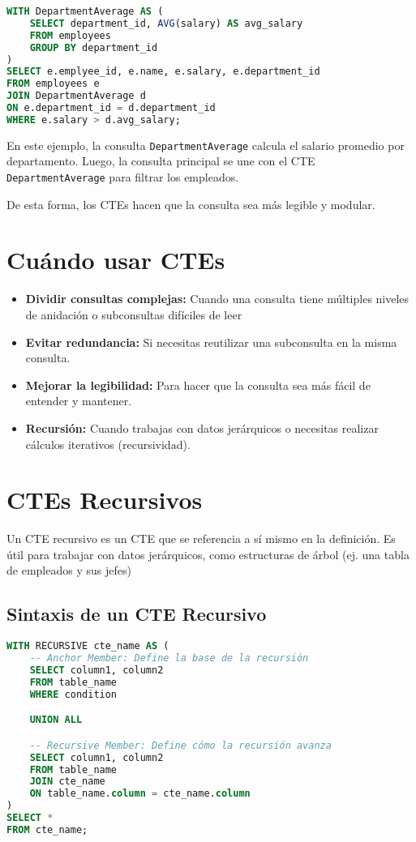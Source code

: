 \begin{lstlisting}[language=SQL]
WITH DepartmentAverage AS (
    SELECT department_id, AVG(salary) AS avg_salary
    FROM employees
    GROUP BY department_id
)
SELECT e.emplyee_id, e.name, e.salary, e.department_id
FROM employees e
JOIN DepartmentAverage d
ON e.department_id = d.department_id
WHERE e.salary > d.avg_salary;
\end{lstlisting}

En este ejemplo, la consulta \texttt{DepartmentAverage} calcula el salario
promedio por departamento. Luego, la consulta principal
se une con el CTE \texttt{DepartmentAverage} para filtrar los empleados.

De esta forma, los CTEs hacen que la consulta sea más legible y modular.

\section{Cuándo usar CTEs}

\begin{itemize}
    \item \textbf{Dividir consultas complejas:} Cuando una consulta tiene múltiples niveles de anidación o subconsultas difíciles de leer
    \item \textbf{Evitar redundancia:} Si necesitas reutilizar una subconsulta en la misma consulta.
    \item \textbf{Mejorar la legibilidad:} Para hacer que la consulta sea más fácil de entender y mantener.
    \item \textbf{Recursión:} Cuando trabajas con datos jerárquicos o necesitas realizar cálculos iterativos (recursividad).
\end{itemize}

\section{CTEs Recursivos}

Un CTE recursivo es un CTE que se referencia a sí mismo en la definición.
Es útil para trabajar con datos jerárquicos, como estructuras de árbol
(ej. una tabla de empleados y sus jefes)

\subsection{Sintaxis de un CTE Recursivo}

\begin{lstlisting}[language=SQL]
WITH RECURSIVE cte_name AS (
    -- Anchor Member: Define la base de la recursión
    SELECT column1, column2
    FROM table_name
    WHERE condition

    UNION ALL

    -- Recursive Member: Define cómo la recursión avanza
    SELECT column1, column2
    FROM table_name
    JOIN cte_name
    ON table_name.column = cte_name.column
)
SELECT *
FROM cte_name;
\end{lstlisting}

